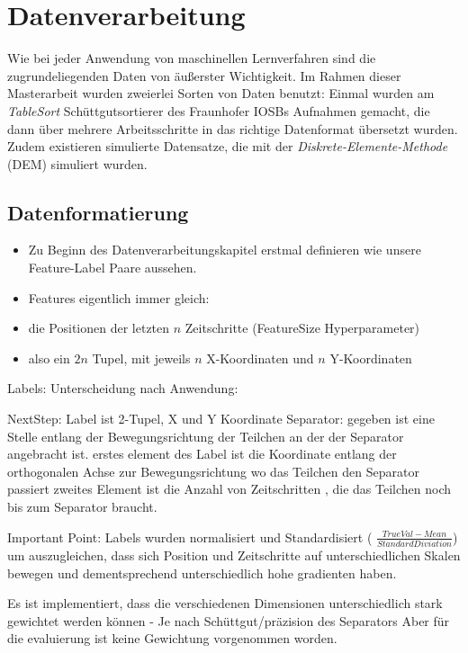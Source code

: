 \chapter{Datenverarbeitung}

Wie bei jeder Anwendung von maschinellen Lernverfahren sind die zugrundeliegenden Daten von äußerster Wichtigkeit.
Im Rahmen dieser Masterarbeit wurden zweierlei Sorten von Daten benutzt:
Einmal wurden am \textit{TableSort} Schüttgutsortierer des Fraunhofer IOSBs Aufnahmen gemacht, 
die dann über mehrere Arbeitsschritte in das richtige Datenformat übersetzt wurden.
Zudem existieren simulierte Datensatze, die mit der \textit{Diskrete-Elemente-Methode} (DEM) simuliert wurden. 



\section{Datenformatierung}

\color{blue}
\begin{itemize}
	\item Zu Beginn des Datenverarbeitungskapitel erstmal definieren wie unsere Feature-Label Paare aussehen.
	\item Features eigentlich immer gleich:
	\item die Positionen der letzten \(n\) Zeitschritte (FeatureSize Hyperparameter)
	\item also ein \(2n\) Tupel, mit jeweils \(n\) X-Koordinaten und \(n\) Y-Koordinaten
\end{itemize}

Labels: Unterscheidung nach Anwendung:

NextStep: Label ist 2-Tupel, X und Y Koordinate
Separator: 
	gegeben ist eine Stelle entlang der Bewegungsrichtung der Teilchen an der der Separator angebracht ist.
	erstes element des Label ist die Koordinate entlang der orthogonalen Achse zur Bewegungsrichtung wo das Teilchen den Separator passiert
	zweites Element ist die Anzahl von Zeitschritten , die das Teilchen noch bis zum Separator braucht.

Important Point: Labels wurden normalisiert und Standardisiert ( \(\frac{TrueVal - Mean}{Standard Diviation}\))
um auszugleichen, dass sich Position und Zeitschritte auf unterschiedlichen Skalen bewegen und dementsprechend unterschiedlich hohe gradienten haben.


Es ist implementiert, dass die verschiedenen Dimensionen unterschiedlich stark gewichtet werden können - Je nach Schüttgut/präzision des Separators
Aber für die evaluierung ist keine Gewichtung vorgenommen worden.

